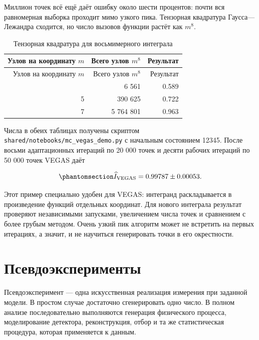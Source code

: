 \documentclass[
  russian,
  11pt,
  a4paper,
  open=any]{scrbook}
\begin{document}
Миллион точек всё ещё даёт ошибку около шести процентов: почти вся
равномерная выборка проходит мимо узкого пика. Тензорная квадратура
Гаусса---Лежандра сходится, но число вызовов функции растёт как \(m^8\).

\begin{longtable}[]{@{}rrr@{}}
\caption{Тензорная квадратура для восьмимерного
интеграла}\label{tbl-ch8-tensor-quadrature}\tabularnewline
\toprule\noalign{}
Узлов на координату \(m\) & Всего узлов \(m^8\) & Результат \\
\midrule\noalign{}
\endfirsthead
\toprule\noalign{}
Узлов на координату \(m\) & Всего узлов \(m^8\) & Результат \\
\midrule\noalign{}
\endhead
\bottomrule\noalign{}
\endlastfoot
3 & 6 561 & 0.589 \\
5 & 390 625 & 0.722 \\
7 & 5 764 801 & 0.963 \\
\end{longtable}

Числа в обеих таблицах получены скриптом
\texttt{shared/notebooks/mc\_vegas\_demo.py} с начальным состоянием
12345. После восьми адаптационных итераций по 20 000 точек и десяти
рабочих итераций по 50 000 точек VEGAS даёт

\begin{equation}\protect\phantomsection\label{eq-ch8-vegas-test-result}{
\widehat I_{\mathrm{VEGAS}}=0.99787\pm0.00053.
}\end{equation}

Этот пример специально удобен для VEGAS: интегранд раскладывается в
произведение функций отдельных координат. Для нового интеграла результат
проверяют независимыми запусками, увеличением числа точек и сравнением с
более грубым методом. Очень узкий пик алгоритм может не встретить на
первых итерациях, а значит, и не научиться генерировать точки в его
окрестности.

\section{Псевдоэксперименты}\label{ux43fux441ux435ux432ux434ux43eux44dux43aux441ux43fux435ux440ux438ux43cux435ux43dux442ux44b}

Псевдоэксперимент --- одна искусственная реализация измерения при
заданной модели. В простом случае достаточно сгенерировать одно число. В
полном анализе последовательно выполняются генерация физического
процесса, моделирование детектора, реконструкция, отбор и та же
статистическая процедура, которая применяется к данным.
\end{document}
